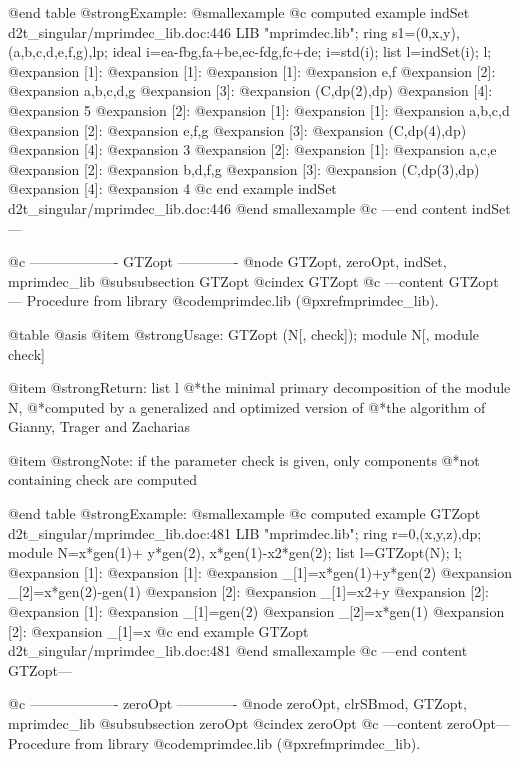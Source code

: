 @end table
@strong{Example:}
@smallexample
@c computed example indSet d2t_singular/mprimdec_lib.doc:446 
LIB "mprimdec.lib";
ring s1=(0,x,y),(a,b,c,d,e,f,g),lp;
ideal i=ea-fbg,fa+be,ec-fdg,fc+de;
i=std(i);
list  l=indSet(i);
l;
@expansion{} [1]:
@expansion{}    [1]:
@expansion{}       [1]:
@expansion{}          e,f
@expansion{}       [2]:
@expansion{}          a,b,c,d,g
@expansion{}       [3]:
@expansion{}          (C,dp(2),dp)
@expansion{}       [4]:
@expansion{}          5
@expansion{} [2]:
@expansion{}    [1]:
@expansion{}       [1]:
@expansion{}          a,b,c,d
@expansion{}       [2]:
@expansion{}          e,f,g
@expansion{}       [3]:
@expansion{}          (C,dp(4),dp)
@expansion{}       [4]:
@expansion{}          3
@expansion{}    [2]:
@expansion{}       [1]:
@expansion{}          a,c,e
@expansion{}       [2]:
@expansion{}          b,d,f,g
@expansion{}       [3]:
@expansion{}          (C,dp(3),dp)
@expansion{}       [4]:
@expansion{}          4
@c end example indSet d2t_singular/mprimdec_lib.doc:446
@end smallexample
@c ---end content indSet---

@c ------------------- GTZopt -------------
@node GTZopt, zeroOpt, indSet, mprimdec_lib
@subsubsection GTZopt
@cindex GTZopt
@c ---content GTZopt---
Procedure from library @code{mprimdec.lib} (@pxref{mprimdec_lib}).

@table @asis
@item @strong{Usage:}
GTZopt (N[, check]); module N[, module check]

@item @strong{Return:}
list l
@*the minimal primary decomposition of the module N,
@*computed by a generalized and optimized version of
@*the algorithm of Gianny, Trager and Zacharias

@item @strong{Note:}
if the parameter check is given, only components
@*not containing check are computed

@end table
@strong{Example:}
@smallexample
@c computed example GTZopt d2t_singular/mprimdec_lib.doc:481 
LIB "mprimdec.lib";
ring r=0,(x,y,z),dp;
module N=x*gen(1)+ y*gen(2),
x*gen(1)-x2*gen(2);
list l=GTZopt(N);
l;
@expansion{} [1]:
@expansion{}    [1]:
@expansion{}       _[1]=x*gen(1)+y*gen(2)
@expansion{}       _[2]=x*gen(2)-gen(1)
@expansion{}    [2]:
@expansion{}       _[1]=x2+y
@expansion{} [2]:
@expansion{}    [1]:
@expansion{}       _[1]=gen(2)
@expansion{}       _[2]=x*gen(1)
@expansion{}    [2]:
@expansion{}       _[1]=x
@c end example GTZopt d2t_singular/mprimdec_lib.doc:481
@end smallexample
@c ---end content GTZopt---

@c ------------------- zeroOpt -------------
@node zeroOpt, clrSBmod, GTZopt, mprimdec_lib
@subsubsection zeroOpt
@cindex zeroOpt
@c ---content zeroOpt---
Procedure from library @code{mprimdec.lib} (@pxref{mprimdec_lib}).

